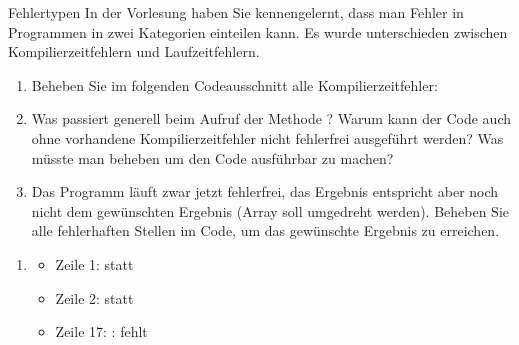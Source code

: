 \documentclass{../tuda-exercise}
\begin{document}
  \clearpage

  \begin{task}[credit=\stars{2}{3}]{Fehlertypen}
    In der Vorlesung haben Sie kennengelernt, dass man Fehler in Programmen in zwei Kategorien
    einteilen kann. Es wurde unterschieden zwischen Kompilierzeitfehlern und Laufzeitfehlern.

    \begin{enumerate}
      [label=(\arabic*)]
      \item Beheben Sie im folgenden Codeausschnitt alle Kompilierzeitfehler:
      
      \item Was passiert generell beim Aufruf der Methode ? Warum kann
      der Code auch ohne vorhandene Kompilierzeitfehler nicht fehlerfrei ausgeführt werden? Was
      müsste man beheben um den Code ausführbar zu machen?
      \item Das Programm läuft zwar jetzt fehlerfrei, das Ergebnis entspricht aber noch nicht dem
      gewünschten Ergebnis (Array soll umgedreht werden). Beheben Sie alle fehlerhaften Stellen
      im Code, um das gewünschte Ergebnis zu erreichen.
    \end{enumerate}

    \clearpagesolution

    \begin{solution}
      \begin{enumerate}
        [label=(\arabic*)]
        \item
        \begin{itemize}
          \item Zeile 1:  statt 
          \item Zeile 2:  statt 
          \item Zeile 17: :  fehlt
        \end{itemize}

        

        \clearpage


\end{enumerate}
\end{solution}
\end{task}
\end{document}
